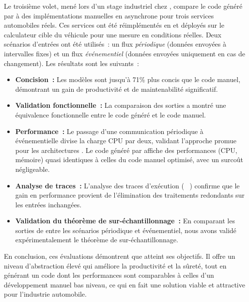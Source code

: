 Le troisième volet, mené lors d'un stage industriel chez \ampere, compare le code généré par \GRust
à des implémentations manuelles en \Rust asynchrone pour trois services automobiles réels. Ces
services ont été réimplémentés en \GRust et déployés sur le calculateur cible du véhicule pour une
mesure en conditions réelles. Deux scénarios d'entrées ont été utilisés~: un flux \emph{périodique}
(données envoyées à intervalles fixes) et un flux \emph{événementiel} (données envoyées uniquement
en cas de changement).
%
Les résultats sont les suivants~:
\begin{itemize}
      \item \textbf{Concision~:} Les modèles \GRust sont jusqu'à 71\% plus concis que le code
            manuel, démontrant un gain de productivité et de maintenabilité significatif.

      \item \textbf{Validation fonctionnelle~:} La comparaison des sorties a montré une équivalence
            fonctionnelle entre le code généré et le code manuel.

      \item \textbf{Performance~:} Le passage d'une communication périodique à événementielle divise
            la charge CPU par deux, validant l'approche promue pour les architectures \sdv. Le code
            généré par \GRust affiche des performances (CPU, mémoire) quasi identiques à celles du
            code manuel optimisé, avec un surcoût négligeable.

      \item \textbf{Analyse de traces~:} L'analyse des traces d'exécution (\via
            \perfetto~\cite{perfetto}) confirme que le gain en performance provient de l'élimination
            des traitements redondants sur les entrées inchangées.

      \item \textbf{Validation du théorème de sur-échantillonnage~:} En comparant les sorties de
            \GRust entre les scénarios périodique et événementiel, nous avons validé
            expérimentalement le théorème de sur-échantillonnage.
\end{itemize}

En conclusion, ces évaluations démontrent que \GRust atteint ses objectifs. Il offre un niveau
d'abstraction élevé qui améliore la productivité et la sûreté, tout en générant un code dont les
performances sont comparables à celles d'un développement manuel bas niveau, ce qui en fait une
solution viable et attractive pour l'industrie automobile.

